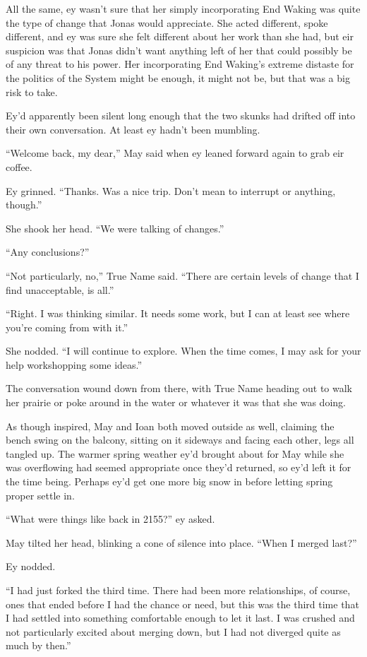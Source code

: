 All the same, ey wasn't sure that her simply incorporating End Waking was quite the type of change that Jonas would appreciate. She acted different, spoke different, and ey was sure she felt different about her work than she had, but eir suspicion was that Jonas didn't want anything left of her that could possibly be of any threat to his power. Her incorporating End Waking's extreme distaste for the politics of the System might be enough, it might not be, but that was a big risk to take.

Ey'd apparently been silent long enough that the two skunks had drifted off into their own conversation. At least ey hadn't been mumbling.

``Welcome back, my dear,'' May said when ey leaned forward again to grab eir coffee.

Ey grinned. ``Thanks. Was a nice trip. Don't mean to interrupt or anything, though.''

She shook her head. ``We were talking of changes.''

``Any conclusions?''

``Not particularly, no,'' True Name said. ``There are certain levels of change that I find unacceptable, is all.''

``Right. I was thinking similar. It needs some work, but I can at least see where you're coming from with it.''

She nodded. ``I will continue to explore. When the time comes, I may ask for your help workshopping some ideas.''

The conversation wound down from there, with True Name heading out to walk her prairie or poke around in the water or whatever it was that she was doing.

As though inspired, May and Ioan both moved outside as well, claiming the bench swing on the balcony, sitting on it sideways and facing each other, legs all tangled up. The warmer spring weather ey'd brought about for May while she was overflowing had seemed appropriate once they'd returned, so ey'd left it for the time being. Perhaps ey'd get one more big snow in before letting spring proper settle in.

``What were things like back in 2155?'' ey asked.

May tilted her head, blinking a cone of silence into place. ``When I merged last?''

Ey nodded.

``I had just forked the third time. There had been more relationships, of course, ones that ended before I had the chance or need, but this was the third time that I had settled into something comfortable enough to let it last. I was crushed and not particularly excited about merging down, but I had not diverged quite as much by then.''

